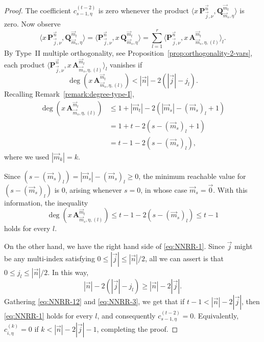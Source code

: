 \documentclass[a4paper]{article}
\theoremstyle{plain}
\theoremstyle{definition}
\begin{document}
\begin{proof}
        The coefficient $c^{(t-2)}_{s-1,\eta}$ is zero whenever the product $\langle x\, \mathbf P_{\vec j,\nu}^{\vec n}, \mathbf Q^{\vec m_t}_{\vec m_s,\eta}\rangle$ is zero. Now observe
        $$
        \langle x\, \mathbf P_{\vec j,\nu}^{\vec n}, \mathbf Q^{\vec m_t}_{\vec m_s,\eta}\rangle = \langle \mathbf P_{\vec j,\nu}^{\vec n}, x\, \mathbf Q^{\vec m_{t}}_{\vec m_{s},\eta}\rangle = \sum_{l=1}^r \langle \mathbf P_{\vec j,\nu}^{\vec n}, x\, \mathbf A^{\vec m_{t}}_{\vec m_{s},\eta,(l)}\rangle_l. 
        $$
        By Type~II multiple orthogonality, see Proposition~\ref{prop:orthogonality-2-vars}, each product $\langle \mathbf P_{\vec j,\nu}^{\vec n}, x\, \mathbf A^{\vec m_{t}}_{\vec m_{s},\eta,(l)}\rangle_l$ vanishes if 
        \begin{equation}
            \label{eq:NNRR-1}
        \deg( x\, \mathbf A^{\vec m_{t}}_{\vec m_{s},\eta,(l)})<|\vec n|-2(|\vec j|-j_l).
        \end{equation}
        Recalling Remark~\ref{remark:degree-type-I},  
        \begin{equation*}
            \begin{aligned}
                \deg(x\, \mathbf A^{\vec m_{t}}_{\vec m_{s},\eta,(l)})&\leq  1 + |\vec m_t|-2(|\vec m_s|-(\vec m_s)_l+1) \\ 
                &=1+t-2(s-(\vec m_{s})_l+1)\\&=t-1-2(s-(\vec m_{s})_l),
            \end{aligned}
        \end{equation*}
        where we used $|\vec m_k|=k$.
          
        Since $(s-(\vec m_{s})_l)=|\vec m_{s}|-(\vec m_{s})_l\geq 0$, the minimum reachable value for $(s-(\vec m_{s})_l)$ is $0$, arising whenever $s=0$, in whose case $\vec m_{s}=\vec 0$. With this information, the inequality 
        \begin{equation}
            \label{eq:NNRR-12}
            \deg( x\, \mathbf A^{\vec m_{t}}_{\vec m_{s},\eta,(l)})\leq t-1-2(s-(\vec m_{s})_l) \leq t-1
        \end{equation}
        holds for every $l$.
        
        On the other hand, we have the right hand side of \eqref{eq:NNRR-1}. Since $\vec j$ might be any multi-index satisfying $0\leq |\vec j|\leq|\vec n|/2$, all we can assert is that $0\leq j_l\leq|\vec n|/2$. In this way, 
        \begin{equation}
            \label{eq:NNRR-3}
            |\vec n|-2(|\vec j|-j_l) \geq |\vec n|-2|\vec j|.
        \end{equation}
        Gathering \eqref{eq:NNRR-12} and \eqref{eq:NNRR-3}, we get that if $t-1<|\vec n|-2|\vec j|$, then \eqref{eq:NNRR-1} holds for every $l$, and consequently $c^{(t-2)}_{s-1,\eta}=0$. Equivalently, $c^{(k)}_{i,\eta}=0$ if $k<|\vec n|-2|\vec j|-1$, completing the proof.

        
        
    \end{proof}
\end{document}
